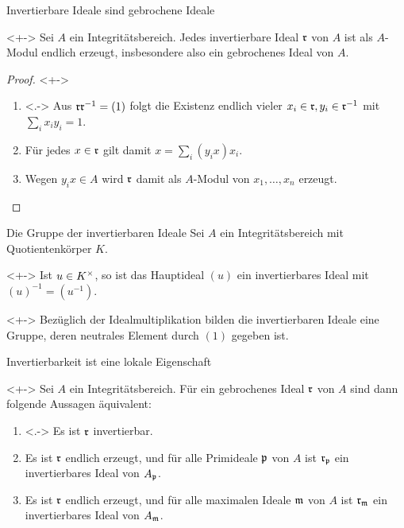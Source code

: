 \begin{frame}{Invertierbare Ideale sind gebrochene Ideale}
	\begin{proposition}<+->
		Sei \(A\) ein Integritätsbereich. Jedes invertierbare Ideal
		\(\mathfrak{r}\) von \(A\) ist als \(A\)-Modul endlich erzeugt, insbesondere
		also ein gebrochenes Ideal von \(A\).
	\end{proposition}
	\begin{proof}<+->
		\begin{enumerate}[<+->]
		\item<.->
			Aus \(\mathfrak{r} \mathfrak{r}^{-1} = (1)\) folgt die Existenz endlich vieler
			\(x_i \in \mathfrak{r}, y_i \in \mathfrak{r}^{-1}\) mit \(\sum\limits_i
			x_i y_i = 1\).
		\item
			Für jedes \(x \in \mathfrak{r}\) gilt damit \(x = \sum\limits_i
			(y_i x) x_i\).
		\item
			Wegen \(y_i x \in A\) wird \(\mathfrak{r}\) damit als \(A\)-Modul von
			\(x_1, \dotsc, x_n\) erzeugt.
			\qedhere
		\end{enumerate}
	\end{proof}
\end{frame}

\begin{frame}{Die Gruppe der invertierbaren Ideale}
	Sei \(A\) ein Integritätsbereich mit Quotientenkörper \(K\).
	\begin{example}<+->
		Ist \(u \in K^\times\), so ist das Hauptideal \((u)\) ein invertierbares
		Ideal mit \((u)^{-1} = (u^{-1})\).
	\end{example}
	\begin{remark}<+->
		Bezüglich der Idealmultiplikation bilden die invertierbaren Ideale
		eine Gruppe, deren neutrales Element durch \((1)\) gegeben ist.
	\end{remark}
\end{frame}

\begin{frame}{Invertierbarkeit ist eine lokale Eigenschaft}
	\begin{proposition}<+->
		Sei \(A\) ein Integritätsbereich. Für ein gebrochenes Ideal
		\(\mathfrak{r}\) von \(A\) sind dann folgende Aussagen äquivalent:
		\begin{enumerate}[<+->]
		\item<.->
			Es ist \(\mathfrak{r}\) invertierbar.
		\item
			Es ist \(\mathfrak{r}\) endlich erzeugt, und für alle Primideale
			\(\mathfrak{p}\) von \(A\) ist \(\mathfrak{r}_{\mathfrak{p}}\) ein
			invertierbares Ideal von \(A_{\mathfrak{p}}\).
		\item
			Es ist \(\mathfrak{r}\) endlich erzeugt, und für alle maximalen
			Ideale \(\mathfrak{m}\) von \(A\) ist \(\mathfrak{r}_{\mathfrak{m}}\) ein
			invertierbares Ideal von \(A_{\mathfrak{m}}\).
		\end{enumerate}
	\end{proposition}
\end{frame}

